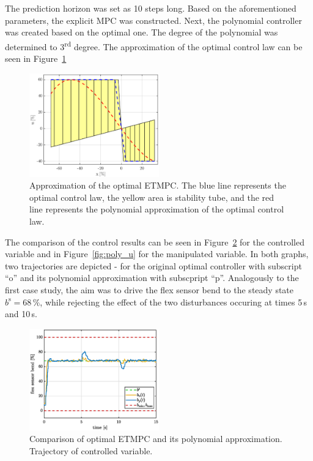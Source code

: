 \documentclass[letterpaper, 10 pt, conference]{ieeeconf}
\begin{document}
The prediction horizon was set as 10 steps long. Based on the aforementioned parameters, the explicit MPC was constructed. Next, the polynomial controller was created based on the optimal one. The degree of the polynomial was determined to 3\textsuperscript{rd} degree. The approximation of the optimal control law can be seen in Figure~\ref{fig:approx}
 

\begin{figure}
	\begin{center}
		\includegraphics[width=0.5\textwidth]{images/approximation.eps}
		\caption{Approximation of the optimal ETMPC. The blue line represents the optimal control law, the yellow area is stability tube, and the red line represents the polynomial approximation of the optimal control law.}
		\label{fig:approx}
	\end{center}
\end{figure}

The comparison of the control results can be seen in Figure~\ref{fig:poly_y} for the controlled variable and in Figure~\ref{fig:poly_u} for the manipulated variable. In both graphs, two trajectories are depicted - for the original optimal controller with subscript ``o'' and its polynomial approximation with subscpript ``p''. Analogously to the first case study, the aim was to drive the flex sensor bend to the steady state $ b^\mathrm{s} = 68\,\%$, while rejecting the effect of the two disturbances occuring at times 5\,s and 10\,s.

\begin{figure}
	\begin{center}
		\includegraphics[width=0.5\textwidth]{images/poly_b.eps}
		\caption{Comparison of optimal ETMPC and its polynomial approximation. Trajectory of controlled variable.}
		\label{fig:poly_y}
	\end{center}
\end{figure}
\end{document}
